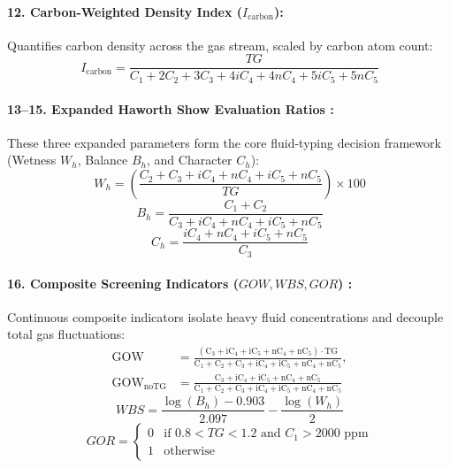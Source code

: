 \paragraph{12. Carbon-Weighted Density Index ($I_{\text{carbon}}$):}
Quantifies carbon density across the gas stream, scaled by carbon atom count:
\begin{equation}
    I_{\text{carbon}} = \frac{TG}{C_1 + 2C_2 + 3C_3 + 4iC_4 + 4nC_4 + 5iC_5 + 5nC_5}
\end{equation}

\paragraph{13--15. Expanded Haworth Show Evaluation Ratios \citep{haworth1985, ref12}:}
These three expanded parameters form the core fluid-typing decision framework (Wetness $W_h$, Balance $B_h$, and Character $C_h$):
\begin{equation}
    W_h = \left( \frac{C_2 + C_3 + iC_4 + nC_4 + iC_5 + nC_5}{TG} \right) \times 100
\end{equation}
\begin{equation}
    B_h = \frac{C_1 + C_2}{C_3 + iC_4 + nC_4 + iC_5 + nC_5}
\end{equation}
\begin{equation}
    C_h = \frac{iC_4 + nC_4 + iC_5 + nC_5}{C_3}
\end{equation}

\paragraph{16. Composite Screening Indicators ($GOW, WBS, GOR$) \citep{whittaker1991, spe2020}:}
Continuous composite indicators isolate heavy fluid concentrations and decouple total gas fluctuations:
\begin{equation}
\begin{aligned}
    \text{GOW} &= \frac{(\text{C}_3 + \text{iC}_4 + \text{iC}_5 + \text{nC}_4 + \text{nC}_5) \cdot \text{TG}}{\text{C}_1 + \text{C}_2 + \text{C}_3 + \text{iC}_4 + \text{iC}_5 + \text{nC}_4 + \text{nC}_5}, \\[1ex]
    \text{GOW}_{\text{noTG}} &= \frac{\text{C}_3 + \text{iC}_4 + \text{iC}_5 + \text{nC}_4 + \text{nC}_5}{\text{C}_1 + \text{C}_2 + \text{C}_3 + \text{iC}_4 + \text{iC}_5 + \text{nC}_4 + \text{nC}_5}
\end{aligned}
\end{equation}
\begin{equation}
    WBS = \frac{\log(B_h) - 0.903}{2.097} - \frac{\log(W_h)}{2}
\end{equation}
\begin{equation}
    GOR = \begin{cases} 0 & \text{if } 0.8 < TG < 1.2 \text{ and } C_1 > 2000 \text{ ppm} \\ 1 & \text{otherwise} \end{cases}
\end{equation}

